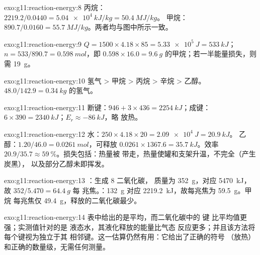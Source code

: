 \begin{solution}{exo:g11:reaction-energy:8}
丙烷：$2219.2 / 0.0440 = \qty{5.04e4}{kJ/kg} = \qty{50.4}{MJ/kg}$。
甲烷：$890.7 / 0.0160 = \qty{55.7}{MJ/kg}$。两者均与图中所示一致。
\end{solution}

\begin{solution}{exo:g11:reaction-energy:9}
$Q = 1500 \times 4.18 \times 85 = \qty{5.33e5}{J} = \qty{533}{kJ}$；
$n = 533 / 890.7 = \qty{0.598}{mol}$，即 $0.598 \times 16.0 =
\qty{9.6}{g}$ 的甲烷；若一半能量损失，则需 \qty{19}{g}。
\end{solution}

\begin{solution}{exo:g11:reaction-energy:10}
氢气 > 甲烷 > 丙烷 > 辛烷 > 乙醇。
$48.0 / 142.9 = \qty{0.34}{kg}$ 的氢气。
\end{solution}

\begin{solution}{exo:g11:reaction-energy:11}
断键：$946 + 3 \times 436 = \qty{2254}{kJ}$；成键：
$6 \times 390 = \qty{2340}{kJ}$；$E_r \approx \qty{-86}{kJ}$，略
放热。
\end{solution}

\begin{solution}{exo:g11:reaction-energy:12}
水：$250 \times 4.18 \times 20 = \qty{2.09e4}{J} = \qty{20.9}{kJ}$。
乙醇：$1.20 / 46.0 = \qty{0.0261}{mol}$，可释放
$0.0261 \times 1367.6 = \qty{35.7}{kJ}$。效率
$20.9 / 35.7 \approx \qty{59}{\percent}$。损失包括：热量被
带走，热量使罐和支架升温，不完全（产生炭黑），
以及部分乙醇未即挥发。
\end{solution}

\begin{solution}{exo:g11:reaction-energy:13}
：生成 8 二氧化碳，
质量为 \qty{352}{g}，对应 \qty{5470}{kJ}，故 $352 / 5.470 = \qty{64.4}{g}$ 每
兆焦。：\qty{132}{g} 对应
\qty{2219.2}{kJ}，故每兆焦为 \qty{59.5}{g}。甲烷
每兆焦仅 \qty{49.4}{g}，释放的二氧化碳最少。
\end{solution}

\begin{solution}{exo:g11:reaction-energy:14}
表中给出的是平均，而二氧化碳中的  键
比平均值更强；实测值针对的是
液态水，其液化释放的能量比气态
反应更多；并且该方法将每个键视为独立于其
相邻键。这一估算仍然有用：它给出了正确的符号
（放热）和正确的数量级，无需任何测量。
\end{solution}

